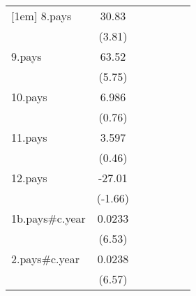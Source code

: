 {\begin{tabular}{l*{6}{c}}
[1em]
8.pays              &       30.83\sym{***}&                     &                     &                     &                     &                     \\
                    &      (3.81)         &                     &                     &                     &                     &                     \\
[1em]
9.pays              &       63.52\sym{***}&                     &                     &                     &                     &                     \\
                    &      (5.75)         &                     &                     &                     &                     &                     \\
[1em]
10.pays             &       6.986         &                     &                     &                     &                     &                     \\
                    &      (0.76)         &                     &                     &                     &                     &                     \\
[1em]
11.pays             &       3.597         &                     &                     &                     &                     &                     \\
                    &      (0.46)         &                     &                     &                     &                     &                     \\
[1em]
12.pays             &      -27.01         &                     &                     &                     &                     &                     \\
                    &     (-1.66)         &                     &                     &                     &                     &                     \\
[1em]
1b.pays#c.year      &      0.0233\sym{***}&                     &                     &                     &                     &                     \\
                    &      (6.53)         &                     &                     &                     &                     &                     \\
[1em]
2.pays#c.year       &      0.0238\sym{***}&                     &                     &                     &                     &                     \\
                    &      (6.57)         &                     &                     &                     &                     &                     \\

\end{tabular}}
